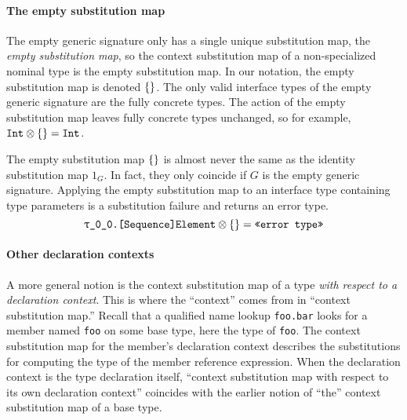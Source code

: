 \documentclass[../generics]{subfiles}
\begin{document}
\paragraph{The empty substitution map}
The empty generic signature only has a single unique substitution map, the \emph{empty substitution map}, so the context substitution map of a non-specialized nominal type is the empty substitution map. In our notation, the empty substitution map is denoted $\{\}$. The only valid interface types of the empty generic signature are the fully concrete types. The action of the empty substitution map leaves fully concrete types unchanged, so for example, $\texttt{Int}\otimes\{\} = \texttt{Int}$.

The empty substitution map $\{\}$ is almost never the same as the identity substitution map $1_G$. In fact, they only coincide if $G$ is the empty generic signature. Applying the empty substitution map to an interface type containing type parameters is a substitution failure and returns an error type.
\[\texttt{\texttt{$\uptau$\_0\_0}.[Sequence]Element} \otimes \{\} = \texttt{<<error type>>}\]

\paragraph{Other declaration contexts} A more general notion is the context substitution map of a type \emph{with respect to a declaration context}. This is where the ``context'' comes from in ``context substitution map.'' Recall that a qualified name lookup \texttt{foo.bar} looks for a member named \texttt{foo} on some base type, here the type of \texttt{foo}. The context substitution map for the member's declaration context describes the substitutions for computing the type of the member reference expression. When the declaration context is the type declaration itself, ``context substitution map with respect to its own declaration context'' coincides with the earlier notion of ``the'' context substitution map of a base type.
\end{document}

